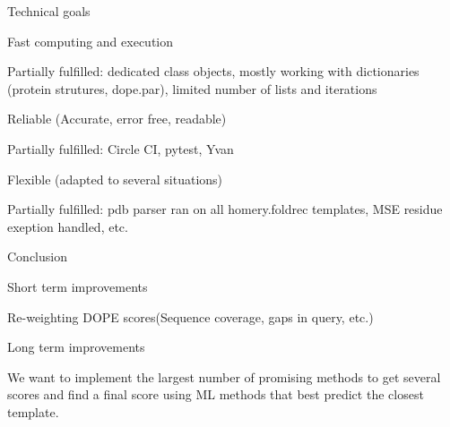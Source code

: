 \begin{frame}{Technical goals}

\begin{block}{Fast computing and execution}

Partially fulfilled: dedicated class objects, mostly working with
dictionaries (protein strutures, dope.par), limited number of lists and
iterations

\end{block}

\begin{block}{Reliable (Accurate, error free, readable)}

Partially fulfilled: Circle CI, pytest, Yvan

\end{block}

\begin{block}{Flexible (adapted to several situations)}

Partially fulfilled: pdb parser ran on all homery.foldrec templates, MSE
residue exeption handled, etc.

\end{block}

\end{frame}

\begin{frame}{Conclusion}

\begin{block}{Short term improvements}

Re-weighting DOPE scores(Sequence coverage, gaps in query, etc.)

\end{block}

\begin{block}{Long term improvements}

We want to implement the largest number of promising methods to get
several scores and find a final score using ML methods that best predict
the closest template.

\end{block}

\end{frame}
